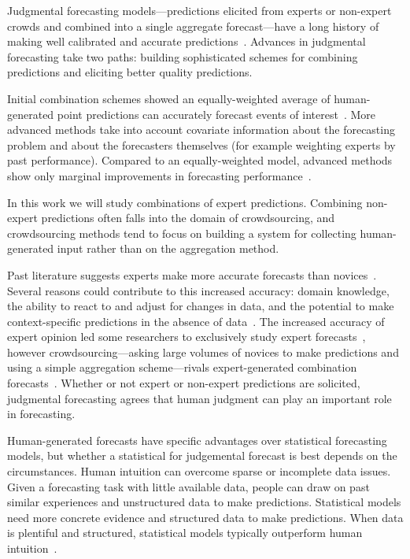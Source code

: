 \documentclass[preprint]{elsarticle}
\begin{document}
Judgmental forecasting models---predictions elicited from experts or non-expert crowds and combined into a single aggregate forecast---have a long history of making well calibrated and accurate predictions~\cite{edmundson1990decomposition,bunn1991interaction,lawrence1992exploring,o1993judgemental}.
Advances in judgmental forecasting take two paths: building sophisticated schemes for combining predictions and eliciting better quality predictions.

Initial combination schemes showed an equally-weighted average of human-generated point predictions can accurately forecast events of interest~\cite{galton1907vox}.
More advanced methods take into account covariate information about the forecasting problem and about the forecasters themselves (for example weighting experts by past performance).
Compared to an equally-weighted model, advanced methods show only marginal improvements in forecasting performance~\cite{fischer1999combining,mclaughlin1973forecasters,armstrong1985crystal,winkler1971probabilistic,clemen1989combining}.

In this work we will study combinations of expert predictions.
Combining non-expert predictions often falls into the domain of crowdsourcing, and crowdsourcing methods tend to focus on building a system for collecting human-generated input rather than on the aggregation method.

Past literature suggests experts make more accurate forecasts than novices~\cite{armstrong2001combining,armstrong1983relative,lawrence2006judgmental,spence1997moderating,alexander1995refining,french2011aggregating,clemen1999combining}.
Several reasons could contribute to this increased accuracy: domain knowledge, the ability to react to and adjust for changes in data, and the potential to make context-specific predictions in the absence of data~\cite{armstrong1983relative,lawrence2006judgmental,spence1997moderating,alexander1995refining}.
The increased accuracy of expert opinion led some researchers to exclusively study expert forecasts~\cite{armstrong2001combining,french2011aggregating,genre2013combining},
however crowdsourcing---asking large volumes of novices to make predictions and using a simple aggregation scheme---rivals expert-generated combination forecasts~\cite{howe2006rise,lintott2008galaxy,prill2011crowdsourcing}.
Whether or not expert or non-expert predictions are solicited, judgmental forecasting agrees that human judgment can play an important role in forecasting.

Human-generated forecasts have specific advantages over statistical forecasting models, but whether a statistical for judgemental forecast is best depends on the circumstances.
Human intuition can overcome sparse or incomplete data issues.
Given a forecasting task with little available data, people can draw on past similar experiences and unstructured data to make predictions.
Statistical models need more concrete evidence and structured data to make predictions.
When data is plentiful and structured, statistical models typically outperform human intuition~\cite{meehl1954clinical,kleinmuntz1990we,yaniv1993judgmental}.
\end{document}
